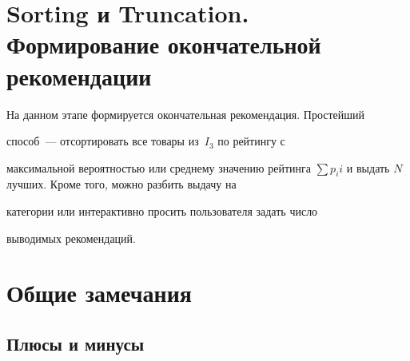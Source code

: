 \section{Sorting и Truncation. Формирование окончательной рекомендации}





На данном этапе формируется окончательная рекомендация. Простейший


способ~--- отсортировать все товары из~$I_3$ по рейтингу с


максимальной ве\-ро\-ят\-ностью или среднему значению рейтинга $\sum p_i


i$ и выдать $N$ лучших. Кроме того, можно разбить выдачу на


категории или интерактивно просить пользователя задать число


выводимых рекомендаций.





\section{Общие замечания}





\subsection{Плюсы и минусы}





\noindent


